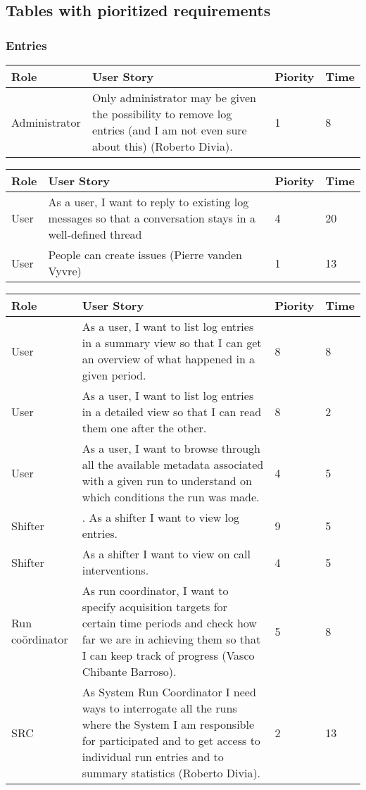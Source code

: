 \subsection{Tables with pioritized requirements}

\subsubsection{Entries}
\begin{longtable}{ | p{2cm} | p{8cm} | p{1.5cm} | l |}
\hline
Role & User Story & Piority & Time \\ \hline
Administrator &  Only administrator may be given the possibility to remove log entries
(and I am not even sure about this) (Roberto Divia). & 1 & 8 \\ \hline
\end{longtable}

\begin{longtable}{ | p{2cm} | p{8cm} | p{1.5cm} | l |}
\hline
Role & User Story & Piority & Time \\ \hline
User &  As a user, I want to reply to existing log messages so that a conversation stays in a well-defined thread & 4 & 20 \\ \hline
User &  People can create issues (Pierre vanden Vyvre) & 1 & 13 \\ \hline


\end{longtable}

\begin{longtable}{ | p{2cm} | p{8cm} | p{1.5cm} | l |}
\hline
Role & User Story & Piority & Time \\ \hline
User &  As a user, I want to list log entries in a summary view so that I can
get an overview of what happened in a given period. & 8 & 8 \\ \hline
User &  As a user, I want to list log entries in a detailed view so that I can read them one after the other. & 8 & 2 \\ \hline
User &  As a user, I want to browse through all the available metadata associated with a given run to understand on which conditions the run was made. & 4 & 5 \\ \hline
Shifter & . As a shifter I want to view log entries. & 9 & 5 \\ \hline
Shifter &  As a shifter I want to view on call interventions. & 4 & 5 \\ \hline
Run coördinator &  As run coordinator, I want to specify acquisition targets for certain
time periods and check how far we are in achieving them so that I can
keep track of progress (Vasco Chibante Barroso). & 5 & 8 \\ \hline
SRC &  As System Run Coordinator I need ways to interrogate all the runs where the System I am responsible for participated and to get access to individual run entries and to summary statistics (Roberto Divia). & 2 & 13 \\ \hline
\end{longtable}

